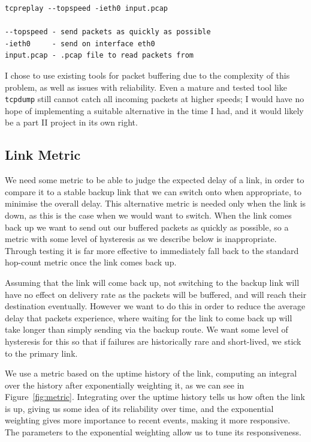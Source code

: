 \documentclass[withindex,glossary,openany]{cam-thesis}
\begin{document}
\begin{lstlisting}[label=replay_command, caption=\texttt{tcpreplay} command with explanation of arguments, frame=tb]
tcpreplay --topspeed -ieth0 input.pcap

--topspeed - send packets as quickly as possible
-ieth0     - send on interface eth0
input.pcap - .pcap file to read packets from
\end{lstlisting}

I chose to use existing tools for packet buffering due to the complexity of this problem, as well as issues with reliability. Even a mature and tested tool like \texttt{tcpdump} still cannot catch all incoming packets at higher speeds; I would have no hope of implementing a suitable alternative in the time I had, and it would likely be a part II project in its own right.

\subsection{Link Metric}

We need some metric to be able to judge the expected delay of a link, in order to compare it to a stable backup link that we can switch onto when appropriate, to minimise the overall delay. This alternative metric is needed only when the link is down, as this is the case when we would want to switch. When the link comes back up we want to send out our buffered packets as quickly as possible, so a metric with some level of hysteresis as we describe below is inappropriate. Through testing it is far more effective to immediately fall back to the standard hop-count metric once the link comes back up.

Assuming that the link will come back up, not switching to the backup link will have no effect on delivery rate as the packets will be buffered, and will reach their destination eventually. However we want to do this in order to reduce the average delay that packets experience, where waiting for the link to come back up will take longer than simply sending via the backup route. We want some level of hysteresis for this so that if failures are historically rare and short-lived, we stick to the primary link.

We use a metric based on the uptime history of the link, computing an integral over the history after exponentially weighting it, as we can see in Figure~\ref{fig:metric}. Integrating over the uptime history tells us how often the link is up, giving us some idea of its reliability over time, and the exponential weighting gives more importance to recent events, making it more responsive. The parameters to the exponential weighting allow us to tune its responsiveness.
\end{document}
